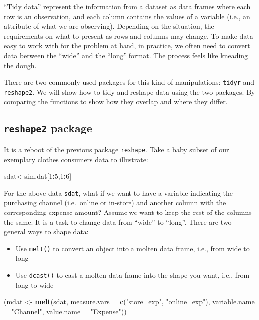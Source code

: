 \documentclass[12pt,]{krantz}
\makeatletter
\newenvironment{Shaded}{\begin{snugshade}}{\end{snugshade}}
\newcommand{\DataTypeTok}[1]{\textcolor[rgb]{0.27,0.27,0.27}{#1}}
\newcommand{\DecValTok}[1]{\textcolor[rgb]{0.06,0.06,0.06}{#1}}
\newcommand{\KeywordTok}[1]{\textcolor[rgb]{0.27,0.27,0.27}{\textbf{#1}}}
\newcommand{\NormalTok}[1]{#1}
\newcommand{\OperatorTok}[1]{\textcolor[rgb]{0.43,0.43,0.43}{\textbf{#1}}}
\newcommand{\StringTok}[1]{\textcolor[rgb]{0.5,0.5,0.5}{#1}}
\providecommand{\tightlist}{%
  \setlength{\itemsep}{0pt}\setlength{\parskip}{0pt}}
\newenvironment{kframe}{%
\medskip{}
\setlength{\fboxsep}{.8em}
 \def\at@end@of@kframe{}%
 \ifinner\ifhmode%
  \def\at@end@of@kframe{\end{minipage}}%
  \begin{minipage}{\columnwidth}%
 \fi\fi%
 \def\FrameCommand##1{\hskip\@totalleftmargin \hskip-\fboxsep
 \colorbox{shadecolor}{##1}\hskip-\fboxsep
     \hskip-\linewidth \hskip-\@totalleftmargin \hskip\columnwidth}%
 \MakeFramed {\advance\hsize-\width
   \@totalleftmargin\z@ \linewidth\hsize
   \@setminipage}}%
 {\par\unskip\endMakeFramed%
 \at@end@of@kframe}
\renewenvironment{Shaded}{\begin{kframe}}{\end{kframe}}
\makeatother
\begin{document}
``Tidy data'' represent the information from a dataset as data frames where each row is an observation, and each column contains the values of a variable (i.e., an attribute of what we are observing). Depending on the situation, the requirements on what to present as rows and columns may change. To make data easy to work with for the problem at hand, in practice, we often need to convert data between the ``wide'' and the ``long'' format. The process feels like kneading the dough.

There are two commonly used packages for this kind of manipulations: \texttt{tidyr} and \texttt{reshape2}. We will show how to tidy and reshape data using the two packages. By comparing the functions to show how they overlap and where they differ.

\hypertarget{reshape2-package}{%
\subsection{\texorpdfstring{\texttt{reshape2} package}{reshape2 package}}\label{reshape2-package}}

It is a reboot of the previous package \texttt{reshape}. Take a baby subset of our exemplary clothes consumers data to illustrate:

\begin{Shaded}
\begin{Highlighting}[]
\NormalTok{sdat<-sim.dat[}\DecValTok{1}\OperatorTok{:}\DecValTok{5}\NormalTok{,}\DecValTok{1}\OperatorTok{:}\DecValTok{6}\NormalTok{]}
\end{Highlighting}
\end{Shaded}

For the above data \texttt{sdat}, what if we want to have a variable indicating the purchasing channel (i.e.~online or in-store) and another column with the corresponding expense amount? Assume we want to keep the rest of the columns the same. It is a task to change data from ``wide'' to ``long''. There are two general ways to shape data:

\begin{itemize}
\tightlist
\item
  Use \texttt{melt()} to convert an object into a molten data frame, i.e., from wide to long
\item
  Use \texttt{dcast()} to cast a molten data frame into the shape you want, i.e., from long to wide
\end{itemize}

\begin{Shaded}
\begin{Highlighting}[]
\NormalTok{(mdat <-}\StringTok{ }\KeywordTok{melt}\NormalTok{(sdat, }\DataTypeTok{measure.vars =} \KeywordTok{c}\NormalTok{(}\StringTok{"store_exp"}\NormalTok{, }\StringTok{"online_exp"}\NormalTok{),}
              \DataTypeTok{variable.name =} \StringTok{"Channel"}\NormalTok{, }
              \DataTypeTok{value.name =} \StringTok{"Expense"}\NormalTok{))}
\end{Highlighting}
\end{Shaded}
\end{document}

